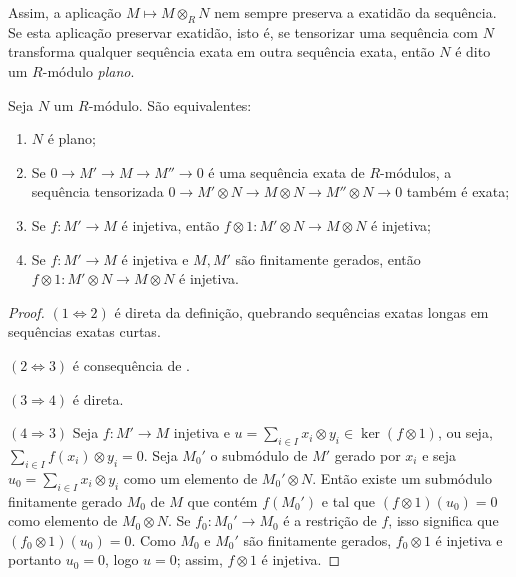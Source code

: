 Assim, a aplicação $M \mapsto M\otimes_R N$ nem sempre preserva a exatidão da sequência. Se esta aplicação preservar exatidão, isto é, se tensorizar uma sequência com $N$ transforma qualquer sequência exata em outra sequência exata, então $N$ é dito um $R$-módulo \emph{plano}.
\begin{prop}
Seja $N$ um $R$-módulo. São equivalentes:
\begin{enumerate}
    \item $N$ é plano;
    \item Se $0 \rightarrow M' \rightarrow M \rightarrow M'' \rightarrow 0$ é uma sequência exata de $R$-módulos, a sequência tensorizada $0 \rightarrow M'\otimes N \rightarrow M\otimes N \rightarrow M''\otimes N \rightarrow 0$ também é exata;
    \item Se $f:M'\rightarrow M$ é injetiva, então $f\otimes 1: M'\otimes N\rightarrow M\otimes N$ é injetiva;
    \item Se $f:M'\rightarrow M$ é injetiva e $M, M'$ são finitamente gerados, então $f\otimes 1: M'\otimes N \rightarrow M \otimes N$ é injetiva.
\end{enumerate}
\begin{proof}
$(1\Leftrightarrow 2)$ é direta da definição, quebrando sequências exatas longas em sequências exatas curtas. \par
$(2 \Leftrightarrow 3)$ é consequência de \cite[II, Proposition 2.18.]{atiyah}. \par
$(3 \Rightarrow 4)$ é direta. \par
$(4 \Rightarrow 3)$ Seja $f:M'\rightarrow M$ injetiva e $u=\sum_{i \in I}x_i \otimes y_i \in \ker(f\otimes 1)$, ou seja, $\sum_{i\in I} f(x_i)\otimes y_i =0$. Seja $M_0'$ o submódulo de $M'$ gerado por $x_i$ e seja $u_0= \sum_{i\in I}x_i \otimes y_i$ como um elemento de $M_0'\otimes N$. Então existe um submódulo finitamente gerado $M_0$ de $M$ que contém $f(M_0')$ e tal que $(f\otimes 1)(u_0) =0$ como elemento de $M_0 \otimes N$. Se $f_0: M_0' \rightarrow M_0$ é a restrição de $f$, isso significa que $(f_0 \otimes 1)(u_0)=0$. Como $M_0$ e $M_0'$ são finitamente gerados, $f_0\otimes 1$ é injetiva e portanto $u_0=0$, logo $u=0$; assim, $f\otimes 1$ é injetiva.
\end{proof}
\end{prop}

